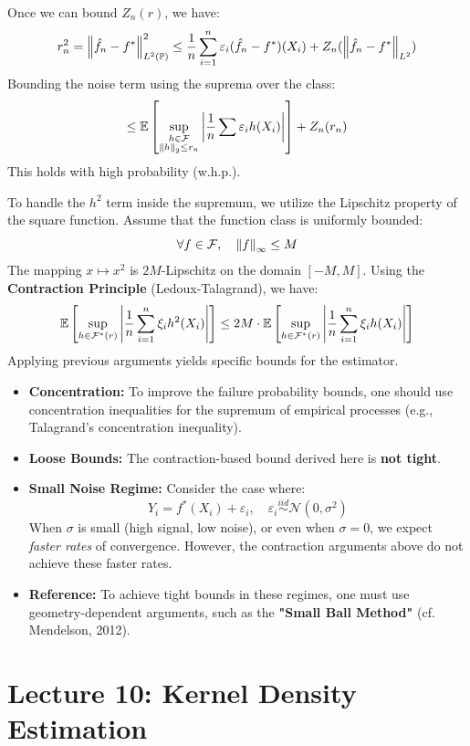 Once we can bound $Z_n(r)$, we have:
\[
r_n^2 = \left\lVert\hat f_n - f^*\right\rVert_{L^2(\mathbb{P})}^2 \le \frac{1}{n} \sum_{i=1}^n \varepsilon_i (\hat f_n - f^*)(X_i) + Z_n(\left\lVert\hat f_n - f^*\right\rVert_{L^2})
\]
Bounding the noise term using the suprema over the class:
\[
\le \mathbb{E} \left[ \sup_{\substack{h \in \mathcal{F} \\ \left\lVert h\right\rVert_2 \le r_n}} \left| \frac{1}{n} \sum \varepsilon_i h(X_i) \right| \right] + Z_n(r_n)
\]
This holds with high probability (w.h.p.).

To handle the $h^2$ term inside the supremum, we utilize the Lipschitz property of the square function. Assume that the function class is uniformly bounded:
\[
\forall f \in \mathcal{F}, \quad \left\lVert f\right\rVert_\infty \le M
\]
The mapping $x \mapsto x^2$ is $2M$-Lipschitz on the domain $[-M, M]$. Using the \textbf{Contraction Principle} (Ledoux-Talagrand), we have:
\[
\mathbb{E} \left[ \sup_{h \in \mathcal{F}^*(r)} \left| \frac{1}{n} \sum_{i=1}^n \xi_i h^2(X_i) \right| \right] \le 2M \cdot \mathbb{E} \left[ \sup_{h \in \mathcal{F}^*(r)} \left| \frac{1}{n} \sum_{i=1}^n \xi_i h(X_i) \right| \right]
\]
Applying previous arguments yields specific bounds for the estimator.
\begin{remark}
    \begin{itemize}
    \item \textbf{Concentration:} To improve the failure probability bounds, one should use concentration inequalities for the supremum of empirical processes (e.g., Talagrand's concentration inequality).
    \item \textbf{Loose Bounds:} The contraction-based bound derived here is \textbf{not tight}.
    \item \textbf{Small Noise Regime:} Consider the case where:
    \[
    Y_i = f^*(X_i) + \varepsilon_i, \quad \varepsilon_i \overset{iid}{\sim} \mathcal{N}(0, \sigma^2)
    \]
    When $\sigma$ is small (high signal, low noise), or even when $\sigma = 0$, we expect \textit{faster rates} of convergence. However, the contraction arguments above do not achieve these faster rates.
    \item \textbf{Reference:} To achieve tight bounds in these regimes, one must use geometry-dependent arguments, such as the \textbf{"Small Ball Method"} (cf. Mendelson, 2012).
\end{itemize}
\end{remark}






\section{Lecture 10: Kernel Density Estimation}

